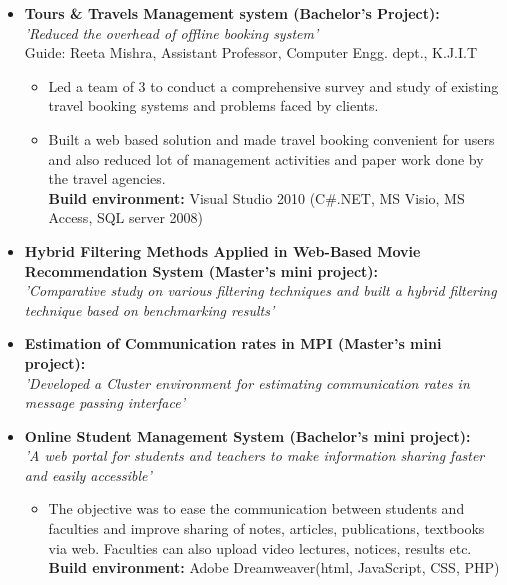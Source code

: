 \documentclass[11pt,letterpaper,sans]{moderncv}        %
\begin{document}
\begin{itemize}
\item{\textbf{Tours \& Travels Management system (Bachelor's Project):}
\\ \textit{'Reduced the overhead of offline booking system'}
\\ Guide: Reeta Mishra, Assistant Professor, Computer Engg. dept., K.J.I.T
\vspace{1pt}
\small{
\begin{itemize}
\item Led a team of 3 to conduct a comprehensive survey and study of existing travel booking systems and problems faced by clients.
\vspace{1pt}
\item Built a web based solution and made travel booking convenient for users and also reduced lot of management activities and paper work done by the travel agencies.
\\ \textbf{ Build environment:} Visual Studio 2010 (C\#.NET, MS Visio, MS Access, SQL server 2008)
\end{itemize}}}

\vspace{5pt}

\item{\textbf{Hybrid Filtering Methods Applied in Web-Based Movie Recommendation System (Master's mini project):}
\\ \textit{'Comparative study on various filtering techniques and built a hybrid filtering technique based on benchmarking results'}}

\vspace{5pt}

\item{\textbf{Estimation of Communication rates in MPI (Master's mini project):}
\\ \textit{'Developed a Cluster environment for estimating communication rates in message passing interface'}}

\vspace{5pt}

\item{\textbf{Online Student Management System (Bachelor's mini project):}
\\ \textit{'A web portal for students and teachers to make information sharing faster and easily accessible'}

\vspace{1pt}

\small{
\begin{itemize}
\item The objective was to ease the communication between students and faculties and improve sharing of notes, articles, publications, textbooks via web. Faculties can also upload video lectures, notices, results etc.
\\ \textbf{Build environment:} Adobe Dreamweaver(html, JavaScript, CSS, PHP)
\end{itemize}}}

\end{itemize}
\end{document}
